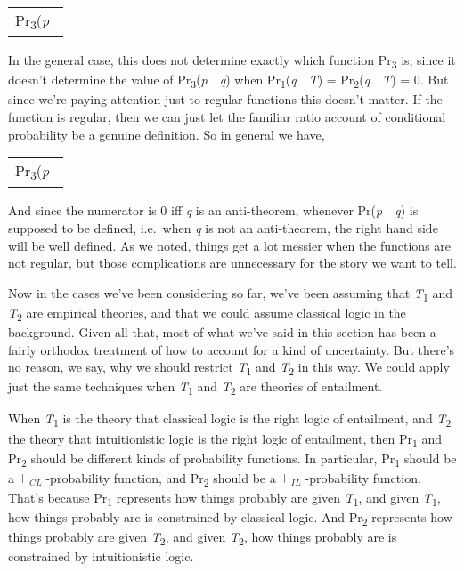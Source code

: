 \documentclass[
  10pt,
  letterpaper,
  DIV=11,
  numbers=noendperiod,
  twoside]{scrartcl}
\begin{document}
\begin{longtable}[]{@{}l@{}}
\toprule\noalign{}
\endhead
\bottomrule\noalign{}
\endlastfoot
Pr\textsubscript{3}(\emph{p}~ \\
\end{longtable}

In the general case, this does not determine exactly which function
Pr\textsubscript{3} is, since it doesn't determine the value of
Pr\textsubscript{3}(\emph{p}~\textbar~\emph{q}) when
Pr\textsubscript{1}(\emph{q}~\textbar~\emph{T}) =
Pr\textsubscript{2}(\emph{q}~\textbar~\emph{T}) = 0. But since we're
paying attention just to regular functions this doesn't matter. If the
function is regular, then we can just let the familiar ratio account of
conditional probability be a genuine definition. So in general we have,

\begin{longtable}[]{@{}l@{}}
\toprule\noalign{}
\endhead
\bottomrule\noalign{}
\endlastfoot
Pr\textsubscript{3}(\emph{p}~ \\
\end{longtable}

And since the numerator is 0 iff \emph{q} is an anti-theorem, whenever
Pr(\emph{p}~\textbar~\emph{q}) is supposed to be defined, i.e.~when
\emph{q} is not an anti-theorem, the right hand side will be well
defined. As we noted, things get a lot messier when the functions are
not regular, but those complications are unnecessary for the story we
want to tell.

Now in the cases we've been considering so far, we've been assuming that
\emph{T}\textsubscript{1} and \emph{T}\textsubscript{2} are empirical
theories, and that we could assume classical logic in the background.
Given all that, most of what we've said in this section has been a
fairly orthodox treatment of how to account for a kind of uncertainty.
But there's no reason, we say, why we should restrict
\emph{T}\textsubscript{1} and \emph{T}\textsubscript{2} in this way. We
could apply just the same techniques when \emph{T}\textsubscript{1} and
\emph{T}\textsubscript{2} are theories of entailment.

When \emph{T}\textsubscript{1} is the theory that classical logic is the
right logic of entailment, and \emph{T}\textsubscript{2} the theory that
intuitionistic logic is the right logic of entailment, then
Pr\textsubscript{1} and Pr\textsubscript{2} should be different kinds of
probability functions. In particular, Pr\textsubscript{1} should be a
\(\vdash_{CL}\)-probability function, and Pr\textsubscript{2} should be
a \(\vdash_{IL}\)-probability function. That's because
Pr\textsubscript{1} represents how things probably are given
\emph{T}\textsubscript{1}, and given \emph{T}\textsubscript{1}, how
things probably are is constrained by classical logic. And
Pr\textsubscript{2} represents how things probably are given
\emph{T}\textsubscript{2}, and given \emph{T}\textsubscript{2}, how
things probably are is constrained by intuitionistic logic.
\end{document}
